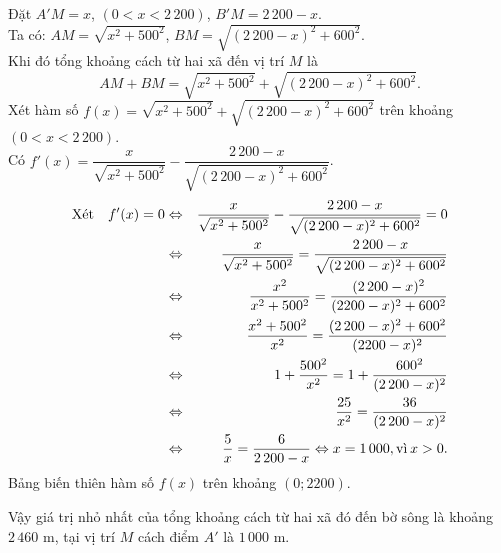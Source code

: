 \begin{bt}
{\begin{center}
		\end{center}
		Đặt $A'M=x$, $(0<x<2\,200)$,  $B'M=2\,200-x$.\\
		Ta có: $AM=\sqrt{x^2+500^2}$, $BM=\sqrt{(2\,200-x)^2+600^2}$.\\
		Khi đó tổng khoảng cách từ hai xã đến vị trí $M$ là
		\[AM+BM= \sqrt{x^2+500^2}+\sqrt{(2\,200-x)^2+600^2}.\]
		Xét hàm số $f(x)= \sqrt{x^2+500^2}+\sqrt{(2\,200-x)^2+600^2}$ trên khoảng $(0<x<2\,200)$.\\ 
		Có $f'(x)=\dfrac{x}{\sqrt{x^2+500^2}}-\dfrac{2\,200-x}{\sqrt{(2\,200-x)^2+600^2}}$.
		\begin{eqnarray*}
			\text{Xét}\quad	f'(x)=0&\Leftrightarrow & \dfrac{x}{\sqrt{x^2+500^2}}-\dfrac{2\,200-x}{\sqrt{(2\,200-x)^2+600^2}}=0\\
			&\Leftrightarrow & \dfrac{x}{\sqrt{x^2+500^2}}=\dfrac{2\,200-x}{\sqrt{(2\,200-x)^2+600^2}}\\
			&\Leftrightarrow & \dfrac{x^2}{x^2+500^2}=\dfrac{(2\,200-x)^2}{(2200-x)^2+600^2}\\
			&\Leftrightarrow &\dfrac{x^2+500^2}{x^2}=\dfrac{(2\,200-x)^2+600^2}{(2200-x)^2}\\
			&\Leftrightarrow &	1+\dfrac{500^2}{x^2}=1+\dfrac{600^2}{(2\,200-x)^2}\\
			&\Leftrightarrow &	\dfrac{25}{x^2}=\dfrac{36}{(2\,200-x)^2}\\
			&\Leftrightarrow &\dfrac{5}{x}=\dfrac{6}{2\,200-x} \Leftrightarrow x=1\,000,  \text{vì}\hspace{.2em} x>0.
		\end{eqnarray*}
		Bảng biến thiên hàm số $f(x)$ trên khoảng $\left( 0;2200\right)$.
		\begin{center}
		\end{center}
		Vậy giá trị nhỏ nhất của tổng khoảng cách từ hai xã đó đến bờ sông  là khoảng $2\,460 \text{ m}$, tại vị trí $M$ cách điểm $A'$  là $1\,000 \text{ m}$.
	}
\end{bt}


